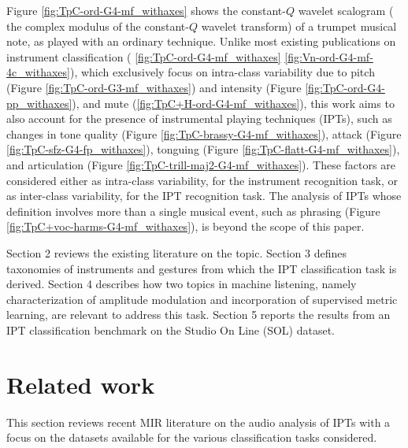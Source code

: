Figure \ref{fig:TpC-ord-G4-mf_withaxes} shows the constant-$Q$ wavelet scalogram (\ie{} the complex modulus of the constant-$Q$ wavelet transform) of a trumpet musical note, as played with an ordinary technique.
Unlike most existing publications on instrument classification (\eg{} \ref{fig:TpC-ord-G4-mf_withaxes} \vs{} \ref{fig:Vn-ord-G4-mf-4c_withaxes}), which exclusively focus on intra-class variability due to pitch (Figure \ref{fig:TpC-ord-G3-mf_withaxes}) and intensity (Figure \ref{fig:TpC-ord-G4-pp_withaxes}), and mute (\ref{fig:TpC+H-ord-G4-mf_withaxes}), this work aims to also account for the presence of instrumental playing techniques (IPTs), such as changes in tone quality (Figure \ref{fig:TpC-brassy-G4-mf_withaxes}), attack (Figure \ref{fig:TpC-sfz-G4-fp_withaxes}), tonguing (Figure \ref{fig:TpC-flatt-G4-mf_withaxes}), and articulation (Figure \ref{fig:TpC-trill-maj2-G4-mf_withaxes}).
These factors are considered either as intra-class variability, for the instrument recognition task, or as inter-class variability, for the IPT recognition task.
The analysis of IPTs whose definition involves more than a single musical event, such as phrasing (Figure \ref{fig:TpC+voc-harms-G4-mf_withaxes}), is beyond the scope of this paper.

Section 2 reviews the existing literature on the topic.
Section 3 defines taxonomies of instruments and gestures from which the IPT classification task is derived.
Section 4 describes how two topics in machine listening, namely characterization of amplitude modulation and incorporation of supervised metric learning, are relevant to address this task.
Section 5 reports the results from an IPT classification benchmark on the Studio On Line (SOL) dataset.



\section{Related work}
This section reviews recent MIR literature on the audio analysis of IPTs with a focus on the datasets available for the various classification tasks considered.

